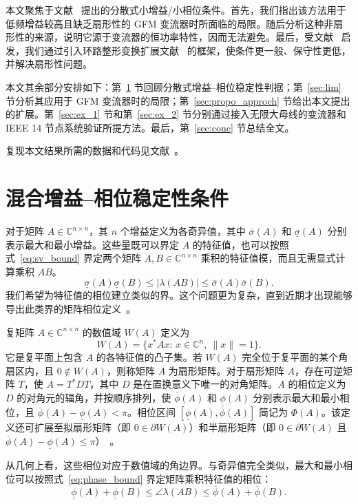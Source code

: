本文聚焦于文献~\cite{huangGainPhaseDecentralized2024} 提出的分散式小增益/小相位条件。首先，我们指出该方法用于低频增益较高且缺乏扇形性的 GFM 变流器时所面临的局限。随后分析这种非扇形性的来源，说明它源于变流器的恒功率特性，因而无法避免。最后，受文献~\cite{deyPassivityBasedDecentralizedCriteria2023} 启发，我们通过引入环路整形变换扩展文献~\cite{huangGainPhaseDecentralized2024} 的框架，使条件更一般、保守性更低，并解决扇形性问题。

本文其余部分安排如下：第~\ref{sec:gain_phase_crit} 节回顾分散式增益--相位稳定性判据；第~\ref{sec:lim} 节分析其应用于 GFM 变流器时的局限；第~\ref{sec:propo_approch} 节给出本文提出的扩展。第~\ref{sec:ex_1} 节和第~\ref{sec:ex_2} 节分别通过接入无限大母线的变流器和 IEEE 14 节点系统验证所提方法。最后，第~\ref{sec:conc} 节总结全文。

复现本文结果所需的数据和代码见文献~\cite{RepoZenodo}。

\section{混合增益--相位稳定性条件}
\label{sec:gain_phase_crit}

对于矩阵 $A\in\mathbb{C}^{n\times n}$，其 $n$ 个增益定义为各奇异值，其中 $\overline{\sigma}(A)$ 和 $\underline{\sigma}(A)$ 分别表示最大和最小增益。这些量既可以界定 $A$ 的特征值，也可以按照式~\eqref{eq:sv_bound} 界定两个矩阵 $A,B\in\mathbb{C}^{n\times n}$ 乘积的特征值模，而且无需显式计算乘积 $AB$。
\begin{equation}
\underline{\sigma}(A)\underline{\sigma}(B)
\leq |\lambda(AB)|
\leq \overline{\sigma}(A)\overline{\sigma}(B).
\label{eq:sv_bound}
\end{equation}
我们希望为特征值的相位建立类似的界。这个问题更为复杂，直到近期才出现能够导出此类界的矩阵相位定义~\cite{wangPhasesComplexMatrix2020,chenPhaseAnalysisIEEE}。

复矩阵 $A\in\mathbb{C}^{n\times n}$ 的数值域 $W(A)$ 定义为
\begin{equation}
W(A)=\{x^*Ax:\,x\in\mathbb{C}^n,\ \|x\|=1\}.
\label{eq:num_range}
\end{equation}
它是复平面上包含 $A$ 的各特征值的凸子集。若 $W(A)$ 完全位于复平面的某个角扇区内，且 $0\notin W(A)$，则称矩阵 $A$ 为扇形矩阵。对于扇形矩阵 $A$，存在可逆矩阵 $T$，使 $A=T^*DT$，其中 $D$ 是在置换意义下唯一的对角矩阵。$A$ 的相位定义为 $D$ 的对角元的辐角，并按顺序排列，使 $\overline{\phi}(A)$ 和 $\underline{\phi}(A)$ 分别表示最大和最小相位，且 $\overline{\phi}(A)-\underline{\phi}(A)<\pi$。相位区间 $[\underline{\phi}(A),\overline{\phi}(A)]$ 简记为 $\Phi(A)$。该定义还可扩展至拟扇形矩阵（即 $0\in\partial W(A)$）和半扇形矩阵（即 $0\in\partial W(A)$ 且 $\overline{\phi}(A)-\underline{\phi}(A)\leq\pi$）~\cite{chenPhaseTheoryMIMO2022}。

从几何上看，这些相位对应于数值域的角边界。与奇异值完全类似，最大和最小相位可以按照式~\eqref{eq:phase_bound} 界定矩阵乘积特征值的相位：
\begin{equation}
\underline{\phi}(A)+\underline{\phi}(B)
\leq \angle\lambda(AB)
\leq \overline{\phi}(A)+\overline{\phi}(B).
\label{eq:phase_bound}
\end{equation}

